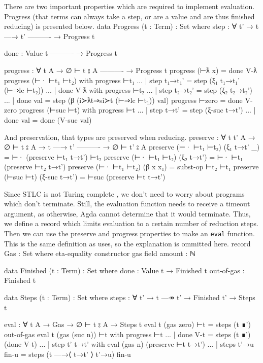 \documentclass[logo,bsc,singlespacing,parskip,online]{infthesis}
\renewenvironment{code}{\mintedcopy[breaklines,breaksymbolleft=\;]{agda}}{\endmintedcopy}
\begin{document}
There are two important properties which are required to implement evaluation. Progress (that terms
can always take a step, or are a value and are thus finished reducing) is presented below.
\begin{code}
  data Progress (t : Term) : Set where
    step : ∀ {t'}
      → t —→ t'
        ----------
      → Progress t

    done :
        Value t
        ----------
      → Progress t

  progress : ∀ {t A}
    → ∅ ⊢ t ⦂ A
      ----------
    → Progress t
  progress (⊢ƛ x) = done V-ƛ
  progress (⊢· ⊢t₁ ⊢t₂) with progress ⊢t₁
  ... | step t₁→t₁' = step (ξ₁ t₁→t₁' (⊢⇒lc ⊢t₂))
  ... | done V-ƛ with progress ⊢t₂
  ...   | step t₂→t₂' = step (ξ₂ t₂→t₂')
  ...   | done val    = step (β (i≻ƛt⇒si≻t (⊢⇒lc ⊢t₁)) val)
  progress ⊢zero = done V-zero
  progress (⊢suc ⊢t) with progress ⊢t
  ... | step t→t' = step (ξ-suc t→t')
  ... | done val  = done (V-suc val)
\end{code}

And preservation, that types are preserved when reducing.
\begin{code}
  preserve : ∀ {t t' A}
    → ∅ ⊢ t ⦂ A
    → t —→ t'
      ----------
    → ∅ ⊢ t' ⦂ A
  preserve (⊢· ⊢t₁ ⊢t₂) (ξ₁ t→t' _) = ⊢· (preserve ⊢t₁ t→t') ⊢t₂
  preserve (⊢· ⊢t₁ ⊢t₂) (ξ₂ t→t') = ⊢· ⊢t₁  (preserve ⊢t₂ t→t')
  preserve (⊢· ⊢t₁ ⊢t₂) (β x x₁) = subst-op ⊢t₂ ⊢t₁
  preserve (⊢suc ⊢t) (ξ-suc t→t') = ⊢suc (preserve ⊢t t→t')
\end{code}

Since STLC is not Turing complete \citep{church_formulation_1940}, we don't need to worry about
programs which don't terminate. Still, the evaluation function needs to receive a timeout argument,
as otherwise, Agda cannot determine that it would terminate. Thus, we define a record which limits
evaluation to a certain number of reduction steps. Then we can use the preserve and progress
properties to make an \texttt{eval} function. This is the same definition as
\citet{wadler_programming_2022} uses, so the explanation is ommitted here.
\begin{code}
  record Gas : Set where
    eta-equality
    constructor gas
    field
      amount : ℕ

  data Finished (t : Term) : Set where
    done : Value t → Finished t
    out-of-gas : Finished t

  data Steps (t : Term) : Set where
    steps : ∀ {t'} → t —↠ t' → Finished t' → Steps t

  eval : ∀ {t A} → Gas → ∅ ⊢ t ⦂ A → Steps t
  eval {t} (gas zero) ⊢t = steps (t ∎') out-of-gas
  eval {t} (gas (suc n)) ⊢t with progress ⊢t
  ... | done V-t = steps (t ∎') (done V-t)
  ... | step {t'} t→t' with eval (gas n) (preserve ⊢t t→t')
  ...   | steps t'→u fin-u = steps (t —→⟨ t→t' ⟩ t'→u) fin-u
\end{code}
\end{document}
